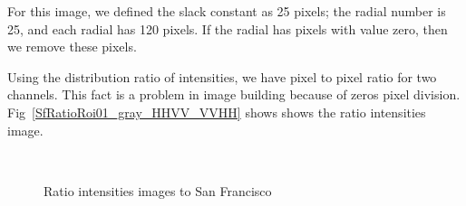 \documentclass[remotesensing,article,submit,pdftex,moreauthors]{Definitions/mdpi}
\begin{document}
For this image, we defined the slack constant as 25 pixels; the radial number is 25, and each radial has 120 pixels. If the radial has pixels with value zero, then we remove these pixels.

Using the distribution ratio of intensities, we have pixel to pixel ratio for two channels. This fact is a problem in image building because of zeros pixel division. Fig~\eqref{SfRatioRoi01_gray_HHVV_VVHH} shows shows the ratio intensities image.
\begin{figure}[hbt]
	\centering
     \\
     \caption{Ratio intensities images to San Francisco}
     \label{SfRatioRoi01_gray_HHVV_VVHH} 
   \end{figure}
\end{document}
